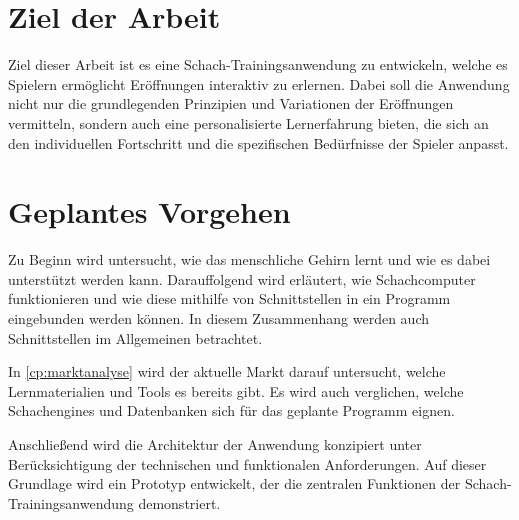 \section{Ziel der Arbeit}
Ziel dieser Arbeit ist es eine Schach-Trainingsanwendung zu entwickeln, welche es Spielern ermöglicht Eröffnungen interaktiv zu erlernen. Dabei soll die Anwendung nicht nur die grundlegenden Prinzipien und Variationen der Eröffnungen vermitteln, sondern auch eine personalisierte Lernerfahrung bieten, die sich an den individuellen Fortschritt und die spezifischen Bedürfnisse der Spieler anpasst.

\section{Geplantes Vorgehen}
Zu Beginn wird untersucht, wie das menschliche Gehirn lernt und wie es dabei unterstützt werden kann. Darauffolgend wird erläutert, wie Schachcomputer funktionieren und wie diese mithilfe von Schnittstellen in ein Programm eingebunden werden können. In diesem Zusammenhang werden auch Schnittstellen im Allgemeinen betrachtet.

In \autoref{cp:marktanalyse} wird der aktuelle Markt darauf untersucht, welche Lernmaterialien und Tools es bereits gibt. Es wird auch verglichen, welche Schachengines und Datenbanken sich für das geplante Programm eignen.

Anschließend wird die Architektur der Anwendung konzipiert unter Berücksichtigung der technischen und funktionalen Anforderungen. Auf dieser Grundlage wird ein Prototyp entwickelt, der die zentralen Funktionen der Schach-Trainingsanwendung demonstriert.

